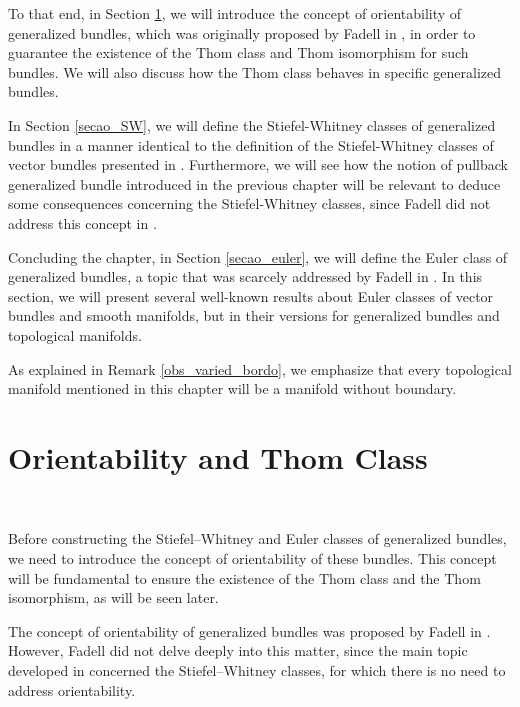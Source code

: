 \documentclass[12pt,oneside]{book}
\begin{document}
    To that end, in Section \ref{secao_thom}, we will introduce the concept of orientability of generalized bundles, which was originally 
    proposed by Fadell in \cite{fadell_1}, in order to guarantee the existence of the Thom class and Thom isomorphism for such bundles. 
    We will also discuss how the Thom class behaves in specific generalized bundles.
    
    In Section \ref{secao_SW}, we will define the Stiefel-Whitney classes of generalized bundles in a manner identical to the definition of 
    the Stiefel-Whitney classes of vector bundles presented in \cite{milnor_1}. Furthermore, we will see how the notion 
    of pullback generalized bundle introduced in the previous chapter will be relevant to deduce some consequences concerning the 
    Stiefel-Whitney classes, since Fadell did not address this concept in \cite{fadell_1}.
    
    Concluding the chapter, in Section \ref{secao_euler}, we will define the Euler class of generalized bundles, a topic that was scarcely 
    addressed by Fadell in \cite{fadell_1}. In this section, we will present several well-known results about Euler classes of vector 
    bundles and smooth manifolds, but in their versions for generalized bundles and topological manifolds.
    
    As explained in Remark \ref{obs_varied_bordo}, we emphasize that every topological manifold mentioned in this chapter will be a 
    manifold without boundary.
    


    \section{Orientability and Thom Class}\label{secao_thom}

    \

    Before constructing the Stiefel–Whitney and Euler classes of generalized 
    bundles, we need to introduce the concept of orientability of these bundles. This concept will be fundamental 
    to ensure the existence of the Thom class and the Thom isomorphism, as will be seen later.

    The concept of orientability of generalized bundles was proposed by Fadell in \cite{fadell_1}. However, Fadell did not delve deeply into 
    this matter, since the main topic developed in \cite{fadell_1} concerned the Stiefel–Whitney classes, for which there is no need to 
    address orientability.
\end{document}

